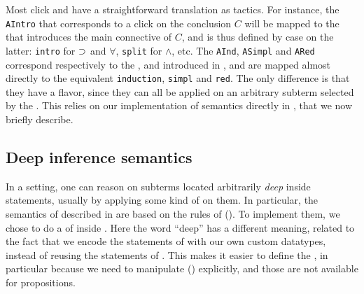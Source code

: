 Most click and  have a straightforward translation as 
tactics. For instance, the \texttt{AIntro}  that corresponds to a click on
the conclusion $C$ will be mapped to the   that introduces
the main connective of $C$, and is thus defined by case on the latter:
\texttt{intro} for $\supset$ and $\forall$, \texttt{split} for $\land$, etc. The
 \texttt{AInd}, \texttt{ASimpl} and \texttt{ARed} correspond respectively
to the  ,  and
 introduced in , and are mapped almost directly
to the equivalent   \texttt{induction}, \texttt{simpl} and
\texttt{red}. The only difference is that they have a \emph{}
flavor, since they can all be applied on an arbitrary subterm selected by the
. This relies on our implementation of 
semantics directly in , that we now briefly describe.

\subsection{Deep inference semantics}

\AP
In a  setting, one can reason on subterms located arbitrarily
\emph{deep} inside statements, usually by applying some kind of  on them. In particular, the semantics of   described in
 are based on the rules of  (). To implement
them, we chose to do a  of  inside . Here
the word ``deep'' has a different meaning, related to the fact that we encode
the statements of  with our own custom datatypes, instead of reusing the
statements of . This makes it easier to define the 
, in particular because we need to manipulate
\emph{} () explicitly, and those are not
available for  propositions.

